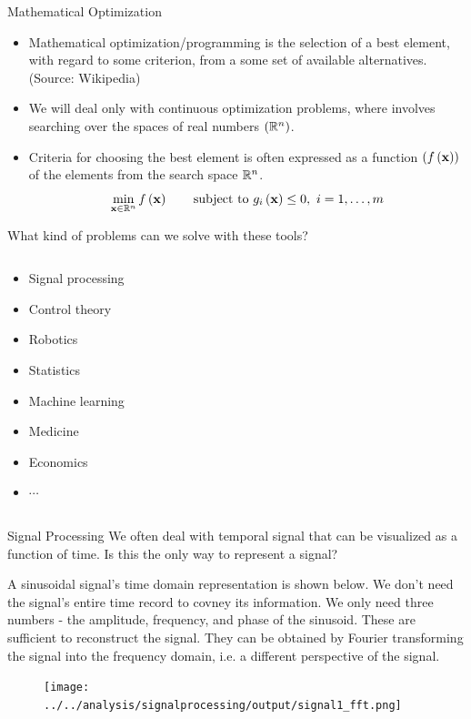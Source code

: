 \documentclass[aspectratio=169]{beamer}
\let\olditem\item
\renewcommand{\item}{\setlength{\itemsep}{\fill}\olditem}
\def\mf{\ensuremath\mathbf}
\def\mb{\ensuremath\mathbb}
\def\lp{\ensuremath\left(}
\def\rp{\ensuremath\right)}
\newcommand{\ct}[1]{\lp #1\rp}
\begin{document}
\begin{frame}{Mathematical Optimization}
  \begin{itemize}
    \item Mathematical optimization/programming is the selection of a best element, with regard to some criterion, from a some set of available alternatives. (Source: Wikipedia)
    
    \item We will deal only with continuous optimization problems, where involves searching over the spaces of real numbers $\ct{\mb{R}^n}$.
    
    \item Criteria for choosing the best element is often expressed as a function $\ct{f\ct{\mf{x}}}$ of the elements from the search space $\mb{R}^n$.
    \[ \min_{\mf{x} \in \mb{R}^n} f\ct{\mf{x}} \quad \quad \mathrm{subject \,\, to} \,\, g_i\ct{\mf{x}} \leq 0, \,\, i = 1, \ldots, m \]
  \end{itemize}
\end{frame}
  

\begin{frame}{What kind of problems can we solve with these tools?}
  \begin{columns}
    \begin{column}{0.3\textwidth}
      \begin{itemize}
        \item Signal processing
        \item Control theory
        \item Robotics
        \item Statistics
        \item Machine learning
        \item Medicine
        \item Economics
        \item $\cdots$
      \end{itemize}
    \end{column}
    \begin{column}{0.675\textwidth}
    \end{column}    
  \end{columns}
\end{frame}


\begin{frame}{Signal Processing}
  We often deal with temporal signal that can be visualized as a function of time. Is this the only way to represent a signal?
  \vspace{0.2cm}

  A sinusoidal signal's time domain representation is shown below. We don't need the signal's entire time record to covney its information. We only need three numbers - the amplitude, frequency, and phase of the sinusoid. These are sufficient to reconstruct the signal. They can be obtained by Fourier transforming the signal into the frequency domain, i.e. a different perspective of the signal.
  \begin{figure}
    \centering
    \texttt{[image: ../../analysis/signalprocessing/output/signal1\_fft.png]}
  \end{figure}
\end{frame}
\end{document}

